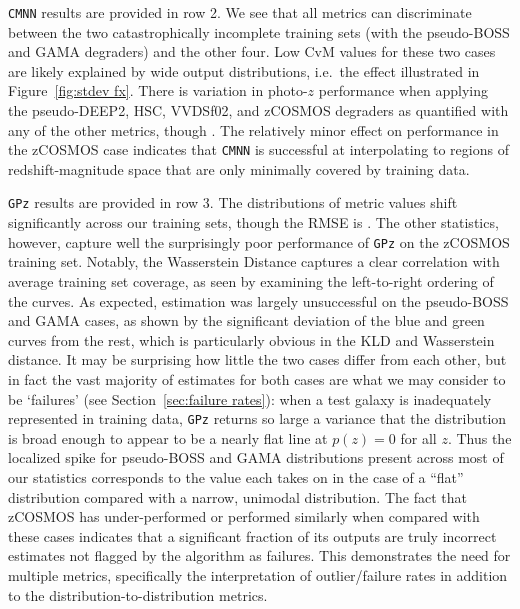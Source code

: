 \documentclass[fleqn,usenatbib,useAMS]{mnras}
\newcommand{\PersonalTag}[3]{{\color{#2}{$^{#1}$ [#3}]}}
\newcommand{\aim}[1]{\PersonalTag{Alex}{violet}{#1}}
\newcommand{\refresponse}[1]{{\color{black}{#1}}}
\begin{document}
\texttt{CMNN} results are provided in row 2. 
We see that all  metrics \refresponse{except for the KS test} can discriminate between the two catastrophically incomplete training sets (with the pseudo-BOSS and GAMA degraders) and the other four. 
Low CvM values for these two cases are likely explained by wide output distributions, i.e.~the effect illustrated in Figure~\ref{fig:stdev fx}. 
There is \refresponse{less} variation in photo-$z$ performance when applying the pseudo-DEEP2, HSC, VVDSf02, and zCOSMOS degraders as quantified with any of the other metrics, though \refresponse{all but the KS test reveal some differences between the degraders}. 
The relatively minor effect on performance in the zCOSMOS case indicates that \texttt{CMNN} is successful at interpolating to regions of redshift-magnitude space that are only minimally covered by training data. 

\texttt{GPz} results are provided in row 3. 
The distributions of metric values shift significantly across our training sets, though the RMSE is \refresponse{the least sensitive of the metrics shown}. 
The other statistics, however, capture well the surprisingly poor performance of \texttt{GPz} on the zCOSMOS training set. 
Notably, the Wasserstein Distance captures a clear correlation with average training set coverage, as seen by examining the left-to-right ordering of the curves. 
As expected, estimation was largely unsuccessful on the pseudo-BOSS and GAMA cases, as shown by the significant deviation of the blue and green curves from the rest, which is particularly obvious in the KLD and Wasserstein distance.
It may be surprising how little the two cases differ from each other, but in fact the vast majority of estimates for both cases are what we may consider to be `failures' (see Section~\ref{sec:failure rates}): 
when a test galaxy is inadequately represented in training data, \texttt{GPz} returns so large a variance that the distribution is broad enough to appear to be a nearly flat line at $p(z) = 0$ for all $z$.
Thus the localized spike for pseudo-BOSS and GAMA distributions present across most of our statistics corresponds to the value each takes on in the case of a ``flat'' distribution compared with a narrow, unimodal distribution. 
The fact that zCOSMOS has under-performed or performed similarly when compared with these cases indicates that a significant fraction of its outputs are truly incorrect estimates not flagged by the algorithm as failures. 
This demonstrates the need for multiple metrics, specifically the interpretation of outlier/failure rates in addition to the distribution-to-distribution metrics.
\end{document}
